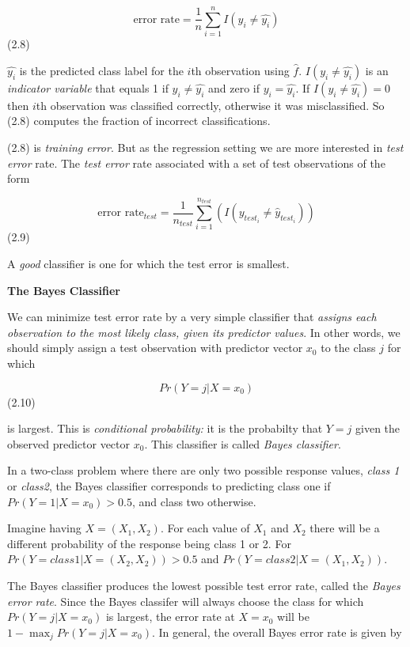 \documentclass[
  letterpaper,
  DIV=11,
  numbers=noendperiod]{scrreprt}
\begin{document}
\[
\text{error rate}=\frac{1}{n}\sum^n_{i=1}I(y_i \neq \hat{y_i})
\] (2.8)

\(\hat{y_i}\) is the predicted class label for the \(i\)th observation
using \(\hat{f}\). \(I(y_i \neq \hat{y_i})\) is an \emph{indicator
variable} that equals 1 if \(y_i \neq \hat{y_i}\) and zero if
\({y_i = \hat{y_i}}\). If \(I(y_i \neq \hat{y_i}) = 0\) then \(i\)th
observation was classified correctly, otherwise it was misclassified. So
(2.8) computes the fraction of incorrect classifications.

(2.8) is \emph{training error}. But as the regression setting we are
more interested in \emph{test error} rate. The \emph{test error} rate
associated with a set of test observations of the form

\[
\text{error rate}_{test} = \frac{1}{n_{test}}\sum_{i=1}^{n_{test}}(I(y_{test_i} \neq \hat{y}_{test_i}))
\] (2.9)

A \emph{good} classifier is one for which the test error is smallest.

\textbf{The Bayes Classifier}

We can minimize test error rate by a very simple classifier that
\emph{assigns each observation to the most likely class, given its
predictor values}. In other words, we should simply assign a test
observation with predictor vector \(x_0\) to the class \(j\) for which

\[
Pr(Y = j | X = x_0)
\] (2.10)

is largest. This is \emph{conditional probability:} it is the probabilty
that \(Y=j\) given the observed predictor vector \(x_0\). This
classifier is called \emph{Bayes classifier}.

In a two-class problem where there are only two possible response
values, \emph{class 1} or \emph{class2}, the Bayes classifier
corresponds to predicting class one if \(Pr(Y=1 | X = x_0) > 0.5\), and
class two otherwise.

Imagine having \(X = (X_1, X_2)\). For each value of \(X_1\) and \(X_2\)
there will be a different probability of the response being class 1 or
2. For \(Pr(Y=class1 | X = (X_2,X_2)) > 0.5\) and
\(Pr(Y=class2 | X = (X_1,X_2))\).

The Bayes classifier produces the lowest possible test error rate,
called the \emph{Bayes error rate}. Since the Bayes classifer will
always choose the class for which \(Pr(Y = j | X = x_0)\) is largest,
the error rate at \(X=x_0\) will be \(1-\max_jPr(Y =j | X = x_0)\). In
general, the overall Bayes error rate is given by
\end{document}
